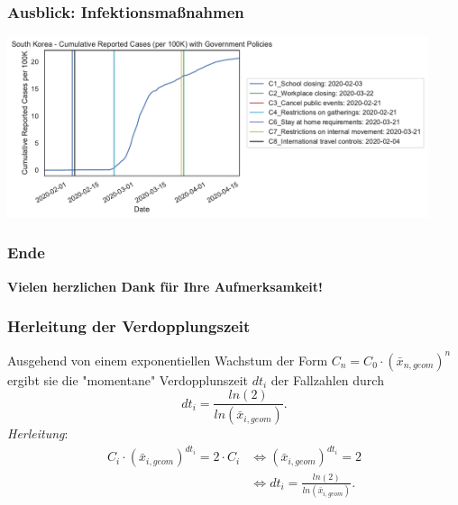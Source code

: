 \documentclass{beamer}
\begin{document}
\begin{frame}
	\frametitle{Ausblick: Infektionsmaßnahmen}
	\centering
	\includegraphics[width = 350pt]{korea}
\end{frame}

\begin{frame}
	\frametitle{Ende}
		\centering
		\textbf{Vielen herzlichen Dank für Ihre Aufmerksamkeit!}
\end{frame}
 
\begin{frame}
	\frametitle{Herleitung der Verdopplungszeit}
	Ausgehend von einem exponentiellen Wachstum der Form $C_n = C_0 \cdot (\bar{x}_{n, geom})^{n}$ ergibt sie die "momentane" Verdopplunszeit $dt_i$ der Fallzahlen durch $$dt_i = \frac{ln(2)}{ln(\bar{x}_{i, geom})}.$$
	\emph{Herleitung}: 
	\begin{align*} C_i \cdot (\bar{x}_{i, geom})^{dt_i} = 2 \cdot C_i 
		 &\iff (\bar{x}_{i, geom})^{dt_i} = 2 \\
	 	&\iff dt_i = \frac{ln(2)}{ln(\bar{x}_{i, geom})}.
	\end{align*}
\end{frame}
\end{document}
